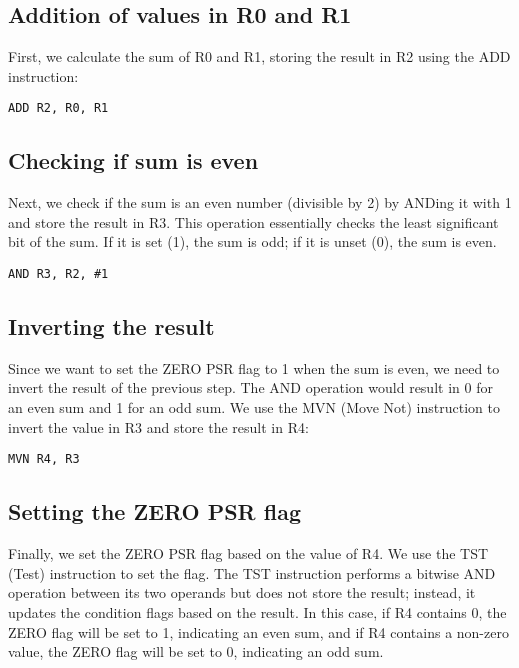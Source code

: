 \subsection{Addition of values in R0 and R1}

First, we calculate the sum of R0 and R1, storing the result in R2 using the ADD instruction:

\begin{verbatim}
ADD R2, R0, R1
\end{verbatim}

\subsection{Checking if sum is even}

Next, we check if the sum is an even number (divisible by 2) by ANDing it with 1 and store the result in R3. This operation essentially checks the least significant bit of the sum. If it is set (1), the sum is odd; if it is unset (0), the sum is even.

\begin{verbatim}
AND R3, R2, #1
\end{verbatim}

\subsection{Inverting the result}

Since we want to set the ZERO PSR flag to 1 when the sum is even, we need to invert the result of the previous step. The AND operation would result in 0 for an even sum and 1 for an odd sum. We use the MVN (Move Not) instruction to invert the value in R3 and store the result in R4:

\begin{verbatim}
MVN R4, R3
\end{verbatim}

\subsection{Setting the ZERO PSR flag}

Finally, we set the ZERO PSR flag based on the value of R4. We use the TST (Test) instruction to set the flag. The TST instruction performs a bitwise AND operation between its two operands but does not store the result; instead, it updates the condition flags based on the result. In this case, if R4 contains 0, the ZERO flag will be set to 1, indicating an even sum, and if R4 contains a non-zero value, the ZERO flag will be set to 0, indicating an odd sum.

